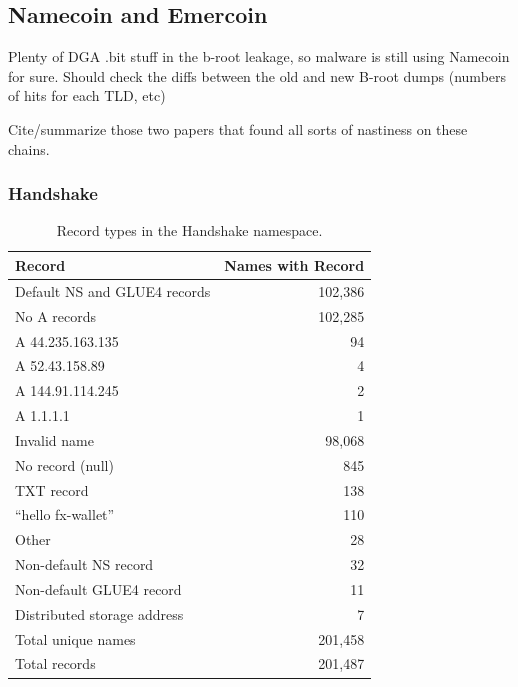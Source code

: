 \documentclass[10pt,sigconf,letterpaper]{acmart}
\begin{document}
\subsection{Namecoin and Emercoin}

Plenty of DGA .bit stuff in the b-root leakage, so malware is 
still using Namecoin for sure. Should check the diffs between 
the old and new B-root dumps (numbers of hits for each TLD, 
etc)

Cite/summarize those two papers that found all sorts of 
nastiness on these chains.

\subsubsection{Handshake}
\begin{table}
	\begin{tabular}{lr}
		\toprule
		Record & Names with Record \\
		\midrule
		Default NS and GLUE4 records & 102,386 \\
		\hspace*{0.2in} No A records & 102,285\\
		\hspace*{0.2in} A 44.235.163.135 & 94 \\
		\hspace*{0.2in} A 52.43.158.89 & 4 \\
		\hspace*{0.2in} A 144.91.114.245 & 2 \\
		\hspace*{0.2in} A 1.1.1.1 & 1 \\
		Invalid name & 98,068 \\
		No record (null) & 845 \\
		TXT record & 138 \\
		\hspace*{0.2in} ``hello fx-wallet'' & 110 \\
		\hspace*{0.2in} Other & 28 \\
		Non-default NS record & 32 \\
		Non-default GLUE4 record & 11 \\
		Distributed storage address & 7 \\
		\midrule
		Total unique names & 201,458 \\
		Total records & 201,487 \\
		\bottomrule
	\end{tabular}
	\caption{Record types in the Handshake namespace.}
	\label{tab:handshake_records}
\end{table}
\end{document}

